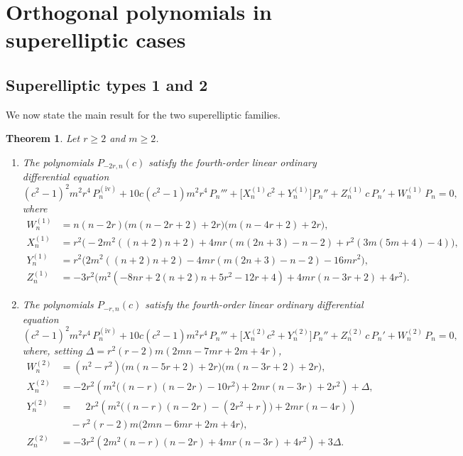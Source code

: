 \documentclass[final,nopreprintline]{elsarticle}
\newtheorem{theorem}{Theorem}[section]
\theoremstyle{definition}
\numberwithin{equation}{section}
\theoremstyle{remark}
\begin{document}
\section{Orthogonal polynomials in superelliptic cases}

\subsection{Superelliptic types 1 and 2}
We now state the main result for the two superelliptic families.

\begin{theorem}\label{thm:main-ode}
Let $r\ge2$ and $m\ge2$.
\begin{enumerate}[\rm(i)]
\item The polynomials $P_{-2r,n}(c)$ satisfy the fourth-order linear ordinary
differential equation
\begin{equation}\label{eqdiferencial1}
(c^2-1)^2 m^2 r^4\,P_n^{(\mathrm{iv})}
+10c(c^2-1)m^2 r^4\,P_n'''
+\bigl[X^{(1)}_n c^2+Y^{(1)}_n\bigr]P_n''
+Z^{(1)}_n\,c\,P_n'
+W^{(1)}_n\,P_n = 0,
\end{equation}
where
\begin{align}
W^{(1)}_n &= n(n-2r)\bigl(m(n-2r+2)+2r\bigr)\bigl(m(n-4r+2)+2r\bigr), \label{eqdiferencial1W}\\[3pt]
X^{(1)}_n &= r^2\bigl(-2m^2((n+2)n+2)+4mr(m(2n+3)-n-2)+r^2(3m(5m+4)-4)\bigr), \label{eqdiferencial1X}\\[3pt]
Y^{(1)}_n &= r^2\bigl(2m^2((n+2)n+2)-4mr(m(2n+3)-n-2)-16mr^2\bigr), \label{eqdiferencial1Y}\\[3pt]
Z^{(1)}_n &= -3r^2\bigl(m^2(-8nr+2(n+2)n+5r^2-12r+4)+4mr(n-3r+2)+4r^2\bigr). \label{eqdiferencial1Z}
\end{align}

\item The polynomials $P_{-r,n}(c)$ satisfy the fourth-order linear ordinary
differential equation
\begin{equation}\label{eqdiferencial2}
(c^2-1)^2 m^2 r^4\,P_n^{(\mathrm{iv})}
+10c(c^2-1)m^2 r^4\,P_n'''
+\bigl[X^{(2)}_n c^2+Y^{(2)}_n\bigr]P_n''
+Z^{(2)}_n\,c\,P_n'
+W^{(2)}_n\,P_n = 0,
\end{equation}
where, setting $\Delta = r^2(r-2)m(2mn-7mr+2m+4r)$,
\begin{align}
W^{(2)}_n &= (n^2-r^2)\bigl(m(n-5r+2)+2r\bigr)\bigl(m(n-3r+2)+2r\bigr),\label{eqdiferencial2W}\\[3pt]
X^{(2)}_n &= -2r^2\!\left(m^2\bigl((n-r)(n-2r)-10r^2\bigr)+2mr(n-3r)+2r^2\right)+\Delta,\label{eqdiferencial2X}\\[3pt]
Y^{(2)}_n &= \phantom{-}2r^2\!\left(m^2\bigl((n-r)(n-2r)-(2r^2+r)\bigr)+2mr(n-4r)\right)\nonumber\\
    &\quad-r^2(r-2)m\bigl(2mn-6mr+2m+4r\bigr),\label{eqdiferencial2Y}\\[3pt]
Z^{(2)}_n &= -3r^2\!\left(2m^2(n-r)(n-2r)+4mr(n-3r)+4r^2\right)+3\Delta.\label{eqdiferencial2Z}
\end{align}
\end{enumerate}
\end{theorem}
\end{document}
